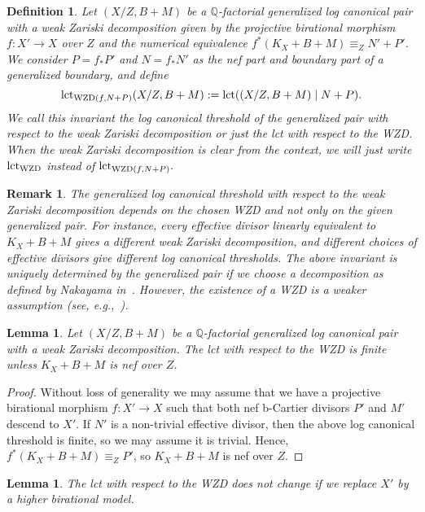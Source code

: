 \documentclass{amsart}
\renewcommand{\qq}{\mathbb{Q}}
\newtheorem{lemma}[theorem]{Lemma}
\newtheorem{definition}[theorem]{Definition}
\newtheorem{remark}[theorem]{Remark}
\theoremstyle{remark}
\numberwithin{equation}{section}
\begin{document}
\begin{definition}
{\em
Let $(X/Z,B+M)$ be a $\qq$-factorial generalized log canonical pair with a weak Zariski decomposition 
given by the projective birational morphism $f\colon X' \rightarrow X$ over $Z$ and
the numerical equivalence $f^*(K_X+B+M)\equiv_Z N'+P'$. We consider 
$P= f_*P'$ and $N=f_*N'$ as the nef part and boundary part of a generalized boundary, 
and define
\[
{\rm lct}_{{\rm WZD} (f,N+P)}(X/Z,B+M) := {\rm lct}((X/Z,B+M)\mid N+P).
\]
We call this invariant {\em the log canonical threshold of the generalized pair with respect to the weak Zariski decomposition}
or just the {\em lct with respect to the WZD}.
When the weak Zariski decomposition is clear from the context, we will just write
${\rm lct}_{\rm WZD}$ instead of ${\rm lct}_{{\rm WZD}(f,N+P)}.$}
\end{definition}

\begin{remark}
{\em The generalized log canonical threshold with respect to the weak Zariski decomposition 
depends on the chosen WZD and not only on the given generalized pair. 
For instance, every effective divisor linearly equivalent to $K_X+B+M$ gives a different weak Zariski decomposition, 
and different choices of effective divisors give different log canonical thresholds.
The above invariant is uniquely determined by the generalized pair if we choose a decomposition as defined by Nakayama in~\cite[Chapter 3, \S 1.a.]{Nak04}. 
However, the existence of a WZD is a weaker assumption (see, e.g.,~\cite{Bir12a}).}
\end{remark}

\begin{lemma}\label{finiteness}
Let $(X/Z,B+M)$ be a $\qq$-factorial generalized log canonical pair with a weak Zariski decomposition.
The lct with respect to the WZD is finite unless $K_X+B+M$ is nef over $Z$.
\end{lemma}

\begin{proof}
Without loss of generality we may assume that we have a projective birational morphism $f\colon X'\rightarrow X$
such that both nef b-Cartier divisors $P'$ and $M'$ descend to $X'$.
If $N'$ is a non-trivial effective divisor, then the above log canonical threshold is finite, so we may assume it is trivial.
Hence, $f^*(K_X+B+M) \equiv_Z P'$, so $K_X+B+M$ is nef over $Z$.
\end{proof}

\begin{lemma}\label{highermodel}
The lct with respect to the WZD does not change if we replace $X'$ by a higher birational model.
\end{lemma}
\end{document}
